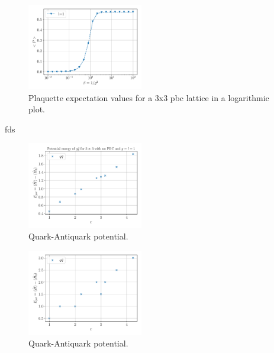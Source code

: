 \begin{figure}[h]
	\begin{center}
		\includegraphics[width=0.45\textwidth]{images/PlaquetteExp3x3PBCLog.pdf}
	\end{center}
	\caption{Plaquette expectation values for a 3x3 pbc lattice in a logarithmic plot.}
\end{figure}
\newpage
fds
\begin{figure}[h]
	\begin{center}
		\includegraphics[width=0.45\textwidth]{images/quark-antiquark-potential.pdf}
	\end{center}
	\caption{Quark-Antiquark potential.}
\end{figure}
\begin{figure}[h]
	\begin{center}
		\includegraphics[width=0.45\textwidth]{images/quark-antiquark-potential2.pdf}
	\end{center}
	\caption{Quark-Antiquark potential.}
\end{figure}
